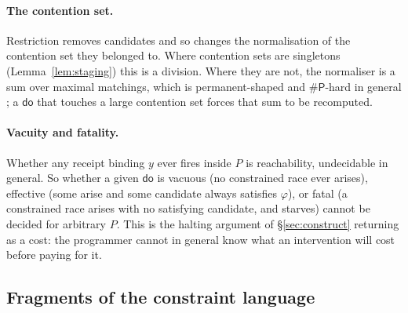 \documentclass[11pt,a4paper]{article}
\theoremstyle{plain}
\theoremstyle{definition}
\theoremstyle{remark}
\newcommand{\dok}{\textsf{do}}
\begin{document}
\paragraph{The contention set.} Restriction removes candidates and so changes
the normalisation of the contention set they belonged to. Where contention sets
are singletons (Lemma~\ref{lem:staging}) this is a division. Where they are
not, the normaliser is a sum over maximal matchings, which is permanent-shaped
and $\#\mathsf{P}$-hard in general \cite{GradedQuantum}; a $\dok$ that touches a
large contention set forces that sum to be recomputed.

\paragraph{Vacuity and fatality.} Whether any receipt binding $y$ ever fires
inside $P$ is reachability, undecidable in general. So whether a given $\dok$
is vacuous (no constrained race ever arises), effective (some arise and some
candidate always satisfies $\varphi$), or fatal (a constrained race arises with
no satisfying candidate, and starves) cannot be decided for arbitrary $P$. This
is the halting argument of \S\ref{sec:construct} returning as a cost: the
programmer cannot in general know what an intervention will cost before paying
for it.

\subsection{Fragments of the constraint language}
\end{document}
